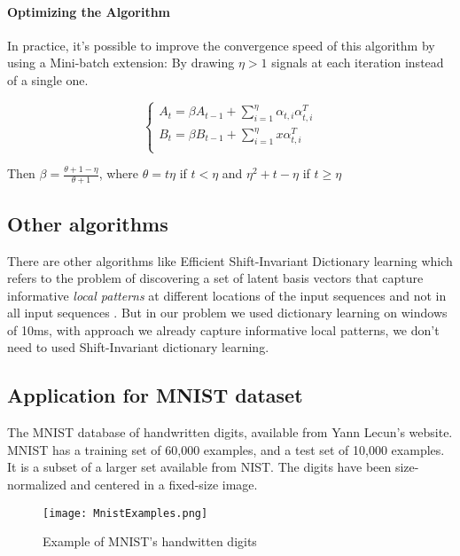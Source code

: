\documentclass[a4paper,10pt]{article}
\begin{document}
\paragraph{Optimizing the Algorithm}
In practice, it's possible to improve the convergence speed of this algorithm by using a Mini-batch extension: By drawing $\eta > 1 $ signals at each iteration instead of a single one. 
\begin{center}
  \[    \left\{
                \begin{array}{ll}
                  A_t  = \beta A_{t-1} + \sum_{i=1}^{\eta} \alpha_{t,i}\alpha_{t,i}^{T}\\
                  B_t = \beta B_{t-1} + \sum_{i=1}^{\eta}x\alpha_{t,i}^{T}\\
                \end{array}
              \right.
  \]
\end{center}

Then $\beta = \frac{\theta + 1 - \eta}{\theta +1}$, where $\theta = t \eta$ if $ t < \eta$ and $\eta^2 + t - \eta$ if $t \geq \eta$

\subsection{Other algorithms}
There are other algorithms like Efficient Shift-Invariant Dictionary learning which refers to the problem of discovering a set of latent basis vectors that capture informative \textit{local patterns} at different locations of the input sequences and not in all input sequences \cite{Zheng:2016:ESD:2939672.2939824}. But in our problem we used dictionary learning on windows of 10ms, with approach we already capture informative local patterns, we don't need to used Shift-Invariant dictionary learning.

\subsection{Application for MNIST dataset}
The MNIST database of handwritten digits, available from Yann Lecun's website. MNIST has a training set of 60,000 examples, and a test set of 10,000 examples. It is a subset of a larger set available from NIST. The digits have been size-normalized and centered in a fixed-size image.
\begin{figure}[h]
 \centering
 \texttt{[image: MnistExamples.png]}
 \caption{Example of MNIST's handwitten digits}
\end{figure}
\end{document}
